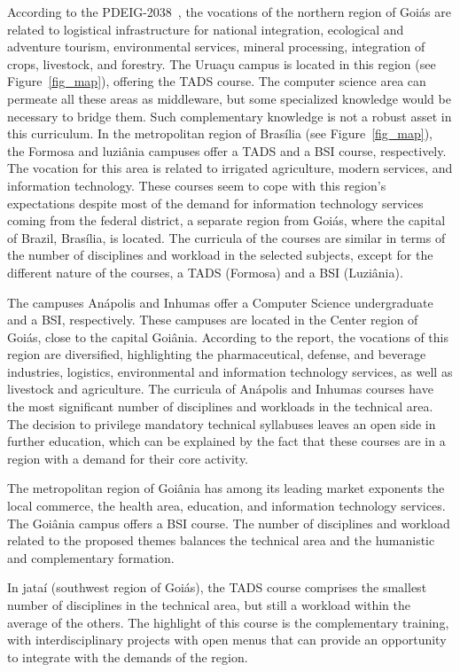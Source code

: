 \documentclass[sigconf, review]{educomp}
\begin{document}
According to the PDEIG-2038~\citep{goias2038}, the vocations of the northern region of Goiás are related to logistical infrastructure for national integration, ecological and adventure tourism, environmental services, mineral processing, integration of crops, livestock, and forestry.
The Uruaçu campus is located in this region (see Figure~\ref{fig_map}), offering the TADS course.
The computer science area can permeate all these areas as middleware, but some specialized knowledge would be necessary to bridge them.
Such complementary knowledge is not a robust asset in this curriculum.
In the metropolitan region of Brasília (see Figure~\ref{fig_map}), the Formosa and luziânia campuses offer a TADS and a BSI course, respectively. 
The vocation for this area is related to irrigated agriculture, modern services, and information technology.
These courses seem to cope with this region's expectations despite most of the demand for information technology services coming from the federal district, a separate region from Goiás, where the capital of Brazil, Brasília, is located.
The curricula of the courses are similar in terms of the number of disciplines and workload in the selected subjects, except for the different nature of the courses, a TADS (Formosa) and a BSI (Luziânia).

The campuses Anápolis and Inhumas offer a Computer Science undergraduate and a BSI, respectively.
These campuses are located in the Center region of Goiás, close to the capital Goiânia.
According to the report, the vocations of this region are diversified, highlighting the pharmaceutical, defense, and beverage industries, logistics, environmental and information technology services, as well as livestock and agriculture.
The curricula of Anápolis and Inhumas courses have the most significant number of disciplines and workloads in the technical area.
The decision to privilege mandatory technical syllabuses leaves an open side in further education, which can be explained by the fact that these courses are in a region with a demand for their core activity.

The metropolitan region of Goiânia has among its leading market exponents the local commerce, the health area, education, and information technology services.
The Goiânia campus offers a BSI course.
The number of disciplines and workload related to the proposed themes balances the technical area and the humanistic and complementary formation.

In jataí (southwest region of Goiás), the TADS course comprises the smallest number of disciplines in the technical area, but still a workload within the average of the others.
The highlight of this course is the complementary training, with interdisciplinary projects with open menus that can provide an opportunity to integrate with the demands of the region.
\end{document}
